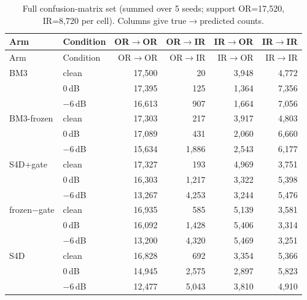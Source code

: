 \begin{longtable}{@{}llrrrr@{}}
\caption{Full confusion-matrix set (summed over 5 seeds; support OR=17{,}520, IR=8{,}720 per cell). Columns give true$\to$predicted counts.}\label{tab:confmat}\\
\toprule
Arm & Condition & OR$\to$OR & OR$\to$IR & IR$\to$OR & IR$\to$IR \\
\midrule
\endfirsthead
\toprule
Arm & Condition & OR$\to$OR & OR$\to$IR & IR$\to$OR & IR$\to$IR \\
\midrule
\endhead
\bottomrule
\endfoot
BM3 & clean & 17{,}500 & 20 & 3{,}948 & 4{,}772 \\
 & 0\,dB & 17{,}395 & 125 & 1{,}364 & 7{,}356 \\
 & $-6$\,dB & 16{,}613 & 907 & 1{,}664 & 7{,}056 \\
BM3-frozen & clean & 17{,}303 & 217 & 3{,}917 & 4{,}803 \\
 & 0\,dB & 17{,}089 & 431 & 2{,}060 & 6{,}660 \\
 & $-6$\,dB & 15{,}634 & 1{,}886 & 2{,}543 & 6{,}177 \\
S4D+gate & clean & 17{,}327 & 193 & 4{,}969 & 3{,}751 \\
 & 0\,dB & 16{,}303 & 1{,}217 & 3{,}322 & 5{,}398 \\
 & $-6$\,dB & 13{,}267 & 4{,}253 & 3{,}244 & 5{,}476 \\
frozen$-$gate & clean & 16{,}935 & 585 & 5{,}139 & 3{,}581 \\
 & 0\,dB & 16{,}092 & 1{,}428 & 5{,}406 & 3{,}314 \\
 & $-6$\,dB & 13{,}200 & 4{,}320 & 5{,}469 & 3{,}251 \\
S4D & clean & 16{,}828 & 692 & 3{,}354 & 5{,}366 \\
 & 0\,dB & 14{,}945 & 2{,}575 & 2{,}897 & 5{,}823 \\
 & $-6$\,dB & 12{,}477 & 5{,}043 & 3{,}810 & 4{,}910 \\
\end{longtable}
